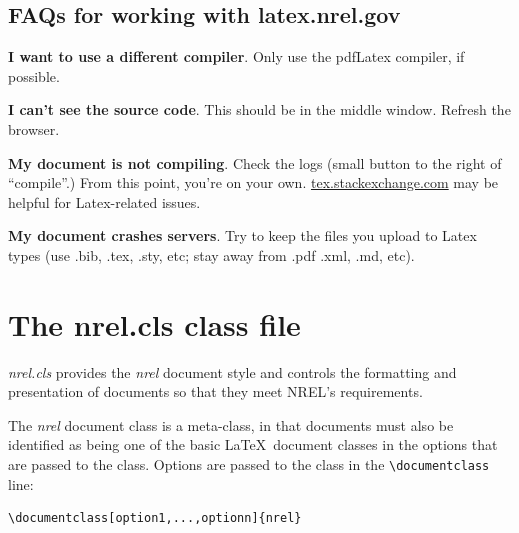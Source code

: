 \subsection{FAQs for working with latex.nrel.gov}
\begin{description}
\item \textbf{I want to use a different compiler}. Only use the pdfLatex compiler, if possible.
\item \textbf{I can't see the source code}. This should be in the middle window. Refresh the browser.
\item \textbf{My document is not compiling}. Check the logs (small button to the right of ``compile''.) From this point, you're on your own. \href{tex.stackexchange.com}{tex.stackexchange.com} may be helpful for Latex-related issues.
\item \textbf{My document crashes servers}. Try to keep the files you upload to Latex types (use .bib, .tex, .sty, etc; stay away from .pdf .xml, .md, etc).
\end{description}

\section{The nrel.cls class file}\label{sec:nrelcls}
\emph{nrel.cls} provides the \emph{nrel} document style and controls the formatting and presentation of documents so that they meet NREL's requirements.

The \emph{nrel} document class is a meta-class, in that documents must also be identified as being one of the basic \LaTeX\ document classes in the options that are passed to the class. Options are passed to the class in the \verb+\documentclass+ line:

\begin{lstlisting}
\documentclass[option1,...,optionn]{nrel}
\end{lstlisting}

